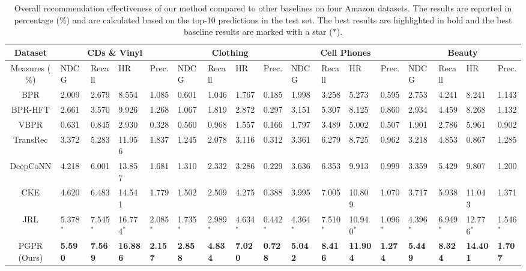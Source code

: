 \documentclass[sigconf]{acmart}
\begin{document}
\begin{table}[t]
\small
\begin{tabular*}{\textwidth}{c|p{2.3em}p{2.3em}p{2.3em}p{2.3em}|p{2.3em}p{2.3em}p{2.3em}p{2.3em}|p{2.3em}p{2.3em}p{2.3em}p{2.3em}|p{2.3em}p{2.3em}p{2.3em}p{2.3em}}
\hline
Dataset & \multicolumn{4}{c|}{\textbf{CDs \& Vinyl}} & \multicolumn{4}{c|}{\textbf{Clothing}} & \multicolumn{4}{c|}{\textbf{Cell Phones}} & \multicolumn{4}{c}{\textbf{Beauty}} \\
\hline 
Measures ($\%$) & NDCG  & Recall & HR    & Prec. & NDCG  & Recall & HR   & Prec. & NDCG  & Recall & HR    & Prec. & NDCG  & Recall & HR     & Prec. \\
\hline 
BPR            & 2.009 & 2.679 & 8.554  & 1.085 & 0.601 & 1.046 & 1.767 & 0.185 & 1.998 & 3.258 & 5.273  & 0.595 & 2.753 & 4.241  & 8.241  & 1.143\\
BPR-HFT        & 2.661 & 3.570 & 9.926  & 1.268 & 1.067 & 1.819 & 2.872 & 0.297 & 3.151 & 5.307 & 8.125  & 0.860 & 2.934 & 4.459  & 8.268  & 1.132\\
VBPR           & 0.631 & 0.845 & 2.930  & 0.328 & 0.560 & 0.968 & 1.557 & 0.166 & 1.797 & 3.489 & 5.002  & 0.507 & 1.901 & 2.786  & 5.961  & 0.902\\
TransRec       & 3.372 & 5.283 & 11.956 & 1.837 & 1.245 & 2.078 & 3.116 & 0.312 & 3.361 & 6.279 & 8.725  & 0.962 & 3.218 & 4.853  & 0.867  & 1.285\\
DeepCoNN       & 4.218 & 6.001 & 13.857 & 1.681 & 1.310 & 2.332 & 3.286 & 0.229 & 3.636 & 6.353 & 9.913  & 0.999 & 3.359 & 5.429  & 9.807  & 1.200\\
CKE            & 4.620 & 6.483 & 14.541 & 1.779 & 1.502 & 2.509 & 4.275 & 0.388 & 3.995 & 7.005 & 10.809 & 1.070 & 3.717 & 5.938  & 11.043 & 1.371\\
JRL            & 5.378$^*$ & 7.545$^*$ & 16.774$^*$ & 2.085$^*$ & 1.735$^*$ & 2.989$^*$ & 4.634$^*$ & 0.442$^*$ & 4.364$^*$ & 7.510$^*$ & 10.940$^*$ & 1.096$^*$ & 4.396$^*$ & 6.949$^*$ & 12.776$^*$ & 1.546$^*$ \\
PGPR (Ours)  & \textbf{5.590} & \textbf{7.569} & \textbf{16.886} & \textbf{2.157} & \textbf{2.858} & \textbf{4.834} & \textbf{7.020} & \textbf{0.728} & \textbf{5.042} & \textbf{8.416} & \textbf{11.904} & \textbf{1.274} & \textbf{5.449} & \textbf{8.324} & \textbf{14.401} & \textbf{1.707} \\
\hline
\end{tabular*}
\caption{Overall recommendation effectiveness of our method compared to other baselines on four Amazon datasets. The results are reported in percentage (\%) and are calculated based on the top-10 predictions in the test set. The best results are highlighted in bold and the best baseline results are marked with a star ($*$).}
\label{tab:eval}
\vspace{-15pt}
\end{table}
\end{document}
